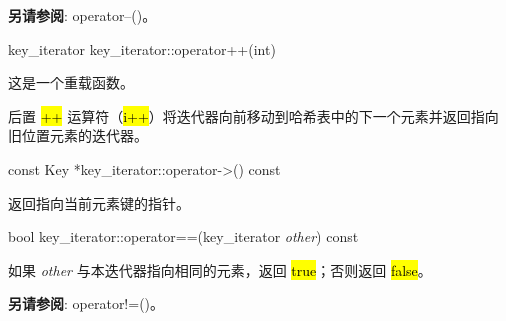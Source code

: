 \textbf{另请参阅}: operator--()。

key\_iterator key\_iterator::operator++(int)

这是一个重载函数。

后置 \hl{++} 运算符（\hl{i++}）将迭代器向前移动到哈希表中的下一个元素并返回指向旧位置元素的迭代器。

const Key *key\_iterator::operator->() const

返回指向当前元素键的指针。

bool key\_iterator::operator==(key\_iterator \emph{other}) const

如果 \emph{other} 与本迭代器指向相同的元素，返回 \hl{true}；否则返回 \hl{false}。

\textbf{另请参阅}: operator!=()。

